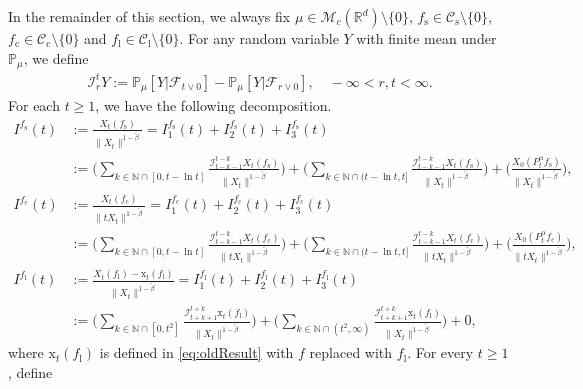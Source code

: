 \documentclass[12pt,a4paper]{amsart}
\theoremstyle{plain}
\theoremstyle{definition}
\numberwithin{equation}{section}
\begin{document}
In the remainder of this section,
we always fix $\mu \in \mathcal M_c(\mathbb R^d)\setminus\{0\}$, $f_\mathrm s\in \mathcal C_\mathrm s\setminus\{0\}$,  $f_\mathrm c\in \mathcal C_\mathrm c\setminus\{0\}$ and $f_\mathrm l\in \mathcal C_\mathrm l\setminus\{0\}$.
For any random variable $Y$ with finite mean under $\mathbb P_\mu$, we define
\begin{align}
\mathcal I_r^t Y := \mathbb P_\mu[Y|\mathscr F_{t\vee 0}] - \mathbb P_\mu[Y|\mathscr F_{r\vee 0}], \quad -\infty < r, t <\infty.
\end{align}
	For each $t\geq 1$,
	we have the following decomposition.
  \begin{align}
     I^{f_\mathrm s}(t) &:= \frac{X_t(f_\mathrm s)}{\|X_t\|^{1- \tilde \beta }}  = I^{f_\mathrm s}_1(t) + I^{f_\mathrm s}_2(t) + I^{f_\mathrm s}_3(t)
        \\&:=  \Big(\sum_{k\in \mathbb N \cap [0,t-\ln t]}  \frac{\mathcal I_{t-k-1}^{t-k} X_t(f_\mathrm s)}{\|X_t\|^{1-\tilde \beta} } \Big) + \Big(\sum_{k\in\mathbb{N}\cap(t-\ln t, t]} \frac{\mathcal I_{t-k-1}^{t-k} X_t(f_\mathrm s)}{\|X_t\|^{1-\tilde \beta}}  \Big)
    + \Big( \frac{X_0(P_t^\alpha f_\mathrm s)}{\|X_t\|^{1-\tilde \beta}}\Big),
       \\ I^{f_\mathrm c}(t)&:=\frac{X_t(f_\mathrm c)}{\|tX_t\|^{1-\tilde \beta}} = I^{f_\mathrm c}_1(t) + I^{f_\mathrm c}_2(t) + I^{f_\mathrm c}_3(t)
    \\&:=  \Big(\sum_{k\in \mathbb N \cap [0,t-\ln t]}  \frac{\mathcal I_{t-k-1}^{t-k} X_t(f_\mathrm c)}{\|tX_t\|^{1-\tilde \beta} } \Big) + \Big(\sum_{k\in\mathbb{N}\cap(t-\ln t, t]} \frac{\mathcal I_{t-k-1}^{t-k} X_t(f_\mathrm c)}{\|tX_t\|^{1-\tilde \beta}}  \Big)    + \Big( \frac{X_0(P_t^\alpha f_\mathrm c)}{\|tX_t\|^{1-\tilde \beta}}\Big),
   \\ I^{f_\mathrm l}(t) &:= \frac{X_t(f_\mathrm l) - \mathrm x_t(f_\mathrm l)}{\|X_t\|^{1- \tilde \beta}}
  = I^{f_\mathrm l}_1(t) + I^{f_\mathrm l}_2(t) + I^{f_\mathrm l}_3(t)
  \\& := \Big(\sum_{k\in \mathbb N \cap [0,t^2]} \frac{ \mathcal I_{t+k+1}^{t+k}\mathrm x_t(f_\mathrm l)}{\|X_t\|^{1- \tilde \beta}}\Big) + \Big(\sum_{k\in \mathbb N \cap (t^2,\infty)}  \frac{ \mathcal I_{t+k+1}^{t+k}\mathrm x_t(f_\mathrm l)}{\|X_t\|^{1- \tilde \beta}}\Big)+0,
  \end{align}
 where $\mathrm x_t(f_\mathrm l)$ is defined in \eqref{eq:oldResult} with $f$ replaced with $f_\mathrm l$.
	For every $t\geq 1$, define
\end{document}
